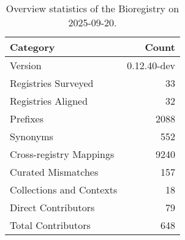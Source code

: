 \begin{table}
\caption{Overview statistics of the Bioregistry on 2025-09-20.}
\label{tab:bioregistry-summary}
\begin{tabular}{lr}
\toprule
Category & Count \\
\midrule
Version & 0.12.40-dev \\
Registries Surveyed & 33 \\
Registries Aligned & 32 \\
Prefixes & 2088 \\
Synonyms & 552 \\
Cross-registry Mappings & 9240 \\
Curated Mismatches & 157 \\
Collections and Contexts & 18 \\
Direct Contributors & 79 \\
Total Contributors & 648 \\
\bottomrule
\end{tabular}
\end{table}
